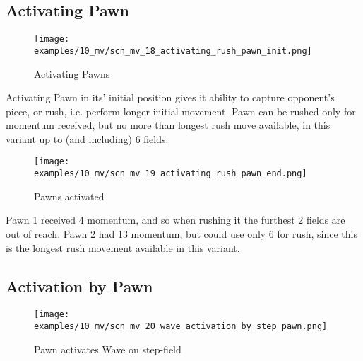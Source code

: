 \clearpage %

\subsection*{Activating Pawn}

\noindent
\begin{figure}[!h]
\texttt{[image: examples/10\_mv/scn\_mv\_18\_activating\_rush\_pawn\_init.png]}
\caption{Activating Pawns}
\label{fig:scn_mv_18_activating_rush_pawn_init}
\end{figure}

Activating Pawn in its' initial position gives it ability to capture opponent's
piece, or rush, i.e. perform longer initial movement. Pawn can be rushed only for
momentum received, but no more than longest rush move available, in this variant
up to (and including) 6 fields.

\clearpage %

\noindent
\begin{figure}[!h]
\texttt{[image: examples/10\_mv/scn\_mv\_19\_activating\_rush\_pawn\_end.png]}
\caption{Pawns activated}
\label{fig:scn_mv_19_activating_rush_pawn_end}
\end{figure}

Pawn 1 received 4 momentum, and so when rushing it the furthest 2 fields are out
of reach. Pawn 2 had 13 momentum, but could use only 6 for rush, since this is the
longest rush movement available in this variant.

\clearpage %

\subsection*{Activation by Pawn}

\vspace*{-1.0ex} %
\noindent
\begin{figure}[!h]
\texttt{[image: examples/10\_mv/scn\_mv\_20\_wave\_activation\_by\_step\_pawn.png]}
\caption{Pawn activates Wave on step-field}
\label{fig:scn_mv_20_wave_activation_by_step_pawn}
\end{figure}


